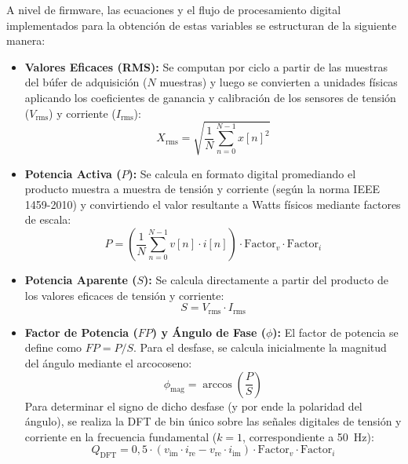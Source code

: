 \documentclass[12pt, a4paper]{article} %
\begin{document}
A nivel de firmware, las ecuaciones y el flujo de procesamiento digital implementados para la obtención de estas variables se estructuran de la siguiente manera:
\begin{itemize}
  \item \textbf{Valores Eficaces (RMS):} Se computan por ciclo a partir de las muestras del búfer de adquisición ($N$ muestras) y luego se convierten a unidades físicas aplicando los coeficientes de ganancia y calibración de los sensores de tensión ($V_{\text{rms}}$) y corriente ($I_{\text{rms}}$):
        \begin{equation}
          X_{\text{rms}} = \sqrt{\frac{1}{N} \sum_{n=0}^{N-1} x[n]^2}
        \end{equation}
  \item \textbf{Potencia Activa ($P$):} Se calcula en formato digital promediando el producto muestra a muestra de tensión y corriente (según la norma IEEE 1459-2010) y convirtiendo el valor resultante a Watts físicos mediante factores de escala:
        \begin{equation}
          P = \left( \frac{1}{N} \sum_{n=0}^{N-1} v[n] \cdot i[n] \right) \cdot \text{Factor}_v \cdot \text{Factor}_i
        \end{equation}
  \item \textbf{Potencia Aparente ($S$):} Se calcula directamente a partir del producto de los valores eficaces de tensión y corriente:
        \begin{equation}
          S = V_{\text{rms}} \cdot I_{\text{rms}}
        \end{equation}
  \item \textbf{Factor de Potencia ($FP$) y Ángulo de Fase ($\phi$):} El factor de potencia se define como $FP = P/S$. Para el desfase, se calcula inicialmente la magnitud del ángulo mediante el arcocoseno:
        \begin{equation}
          \phi_{\text{mag}} = \arccos\left(\frac{P}{S}\right)
        \end{equation}
        Para determinar el signo de dicho desfase (y por ende la polaridad del ángulo), se realiza la DFT de bin único sobre las señales digitales de tensión y corriente en la frecuencia fundamental ($k=1$, correspondiente a \qty{50}{\hertz}):
        \begin{equation}
          Q_{\text{DFT}} = 0,5 \cdot (v_{\text{im}} \cdot i_{\text{re}} - v_{\text{re}} \cdot i_{\text{im}}) \cdot \text{Factor}_v \cdot \text{Factor}_i
        \end{equation}

\end{itemize}
\end{document}
